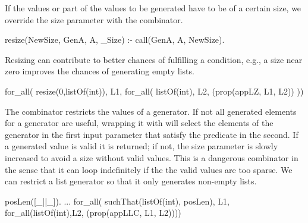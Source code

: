

If the values or part of the values to be generated have to be of a
certain size, we override the size parameter with the 
combinator.
%
\begin{yapcode}
 resize(NewSize, GenA, A, _Size) :- call(GenA, A, NewSize).
\end{yapcode}
%
Resizing can contribute to better chances of fulfilling a condition,
e.g., a size near zero improves the chances of generating empty lists.
%
\begin{yapcode}
 for_all(  resize(0,listOf(int)),  L1,
   for_all( listOf(int), L2, (prop({appLZ, L1, L2})) ))
\end{yapcode}


The  combinator restricts the values of a generator.
%
If not all generated elements for a generator are useful, wrapping it
with  will select the elements of the generator in the
first input parameter that satisfy the predicate in the second.
%
If a generated value is valid it is returned; if not, the size parameter is
slowly increased to avoid a size without valid values.
%
This is a dangerous combinator in the sense that it can loop
indefinitely  if the the valid values are too sparse.
%
We can restrict a list generator so that it only generates non-empty
lists.
%
\begin{yapcode}
 posLen([_||_]).
 ...
   for_all(  suchThat(listOf(int), posLen),  L1,
     for_all(listOf(int),L2, (prop({appLLC, L1, L2}))))
\end{yapcode}

